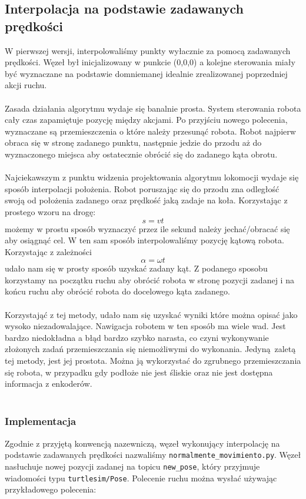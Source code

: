 \documentclass{mwrep}
\begin{document}
\subsection{Interpolacja na podstawie zadawanych prędkości}
W pierwszej wersji, interpolowaliśmy punkty wyłacznie za pomocą 
zadawanych prędkości. Węzeł był inicjalizowany w punkcie (0,0,0) a kolejne sterowania
miały być wyznaczane na podstawie domniemanej idealnie zrealizowanej poprzedniej akcji ruchu.\\
\\
\indent{} Zasada działania algorytmu wydaje się banalnie prosta. System sterowania robota cały 
czas zapamiętuje pozycję między akcjami. Po przyjściu nowego polecenia, wyznaczane są 
przemieszczenia o które należy przesunąć robota. Robot najpierw obraca się w stronę zadanego
punktu, następnie jedzie do przodu aż do wyznaczonego miejsca aby ostatecznie obrócić się do 
zadanego kąta obrotu. \\
\\
\indent{} Najciekawszym z punktu widzenia projektowania algorytmu lokomocji wydaje się sposób interpolacji położenia.
Robot poruszając się do przodu zna odległość swoją od położenia zadanego oraz prędkość jaką zadaje
na koła. Korzystając z prostego wzoru na drogę: $$ s = vt $$ możemy w prostu sposób wyznaczyć
przez ile sekund należy jechać/obracać się aby osiągnąć cel. W ten sam sposób interpolowaliśmy
pozycję kątową robota. Korzystając z zależności $$ \alpha = \omega t $$ udało nam się w prosty
sposób uzyskać zadany kąt. Z podanego sposobu korzystamy na początku ruchu aby obrócić robota w
stronę pozycji zadanej i na końcu ruchu aby obrócić robota do docelowego kąta zadanego. \\
\\
\indent{} Korzystająć z tej metody, udało nam się uzyskać wyniki
które można opisać jako wysoko niezadowalające. Nawigacja robotem w ten sposób ma wiele wad.
Jest bardzo niedokładna a błąd bardzo szybko narasta, co czyni wykonywanie złożonych zadań
przemieszczania się niemożliwymi do wykonania. Jedyną zaletą tej metody, jest jej prostota.
Można ją wykorzystać do zgrubnego przemieszczania się robota, w przypadku gdy podłoże 
nie jest śliskie oraz nie jest dostępna informacja z enkoderów.\\
\\
\subsubsection{Implementacja}
Zgodnie z przyjętą konwencją nazewniczą, węzeł wykonujący interpolację na podstawie 
zadawanych prędkości nazwaliśmy \texttt{normalmente\_{}movimiento.py}. Węzeł nasłuchuje 
nowej pozycji zadanej na topicu \texttt{new\_{}pose}, który przyjmuje wiadomości
typu \texttt{turtlesim/Pose}. Polecenie ruchu można wysłać używając przykładowego polecenia:
\end{document}
